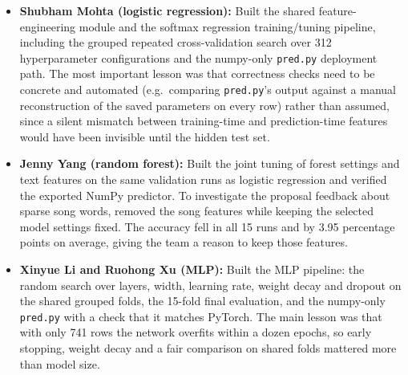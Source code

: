 \documentclass[12pt]{article}
\begin{document}
\begin{itemize}
\item \textbf{Shubham Mohta (logistic regression):} Built the shared feature-engineering
module and the softmax regression training/tuning pipeline, including the grouped repeated
cross-validation search over 312 hyperparameter configurations and the numpy-only \texttt{pred.py}
deployment path. The most important lesson was that correctness checks need to be concrete and
automated (e.g.\ comparing \texttt{pred.py}'s output against a manual reconstruction of the saved
parameters on every row) rather than assumed, since a silent mismatch between training-time and
prediction-time features would have been invisible until the hidden test set.
\item \textbf{Jenny Yang (random forest):} Built the joint tuning of forest settings and text
features on the same validation runs as logistic regression and verified the exported NumPy
predictor. To investigate the proposal feedback about sparse song words, removed the
song features while keeping the selected model settings fixed. The accuracy fell in all 15 runs
and by 3.95 percentage points on average, giving the team a reason to keep those features.
\item \textbf{Xinyue Li and Ruohong Xu (MLP):} Built the MLP pipeline: the random search over layers, width, learning
rate, weight decay and dropout on the shared grouped folds, the 15-fold final evaluation, and the numpy-only
\texttt{pred.py} with a check that it matches PyTorch. The main lesson was that with only 741 rows the network
overfits within a dozen epochs, so early stopping, weight decay and a fair comparison on shared folds mattered more than
model size.
\end{itemize}
\end{document}
